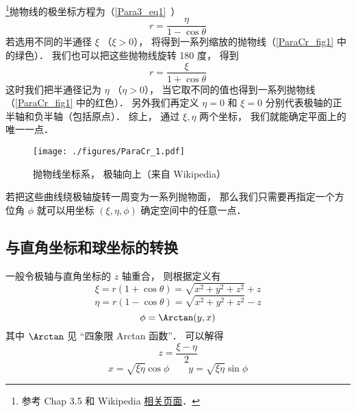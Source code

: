 

\footnote{参考 \cite{Brandsen} Chap 3.5 和 Wikipedia \href{https://en.wikipedia.org/wiki/Parabolic_coordinates}{相关页面}．}抛物线的极坐标方程为（\autoref{Para3_eq1}~）
\begin{equation}\label{ParaCr_eq1}
r = \frac{\eta}{1 - \cos \theta }
\end{equation}
若选用不同的半通径 $\xi$ （$\xi > 0$）， 将得到一系列缩放的抛物线（\autoref{ParaCr_fig1} 中的绿色）． 我们也可以把这些抛物线旋转 180 度， 得到
\begin{equation}
r = \frac{\xi}{1 + \cos \theta }
\end{equation}
这时我们把半通径记为 $\eta$ （$\eta > 0$）， 当它取不同的值也得到一系列抛物线（\autoref{ParaCr_fig1} 中的红色）． 另外我们再定义 $\eta = 0$ 和 $\xi = 0$ 分别代表极轴的正半轴和负半轴（包括原点）． 综上， 通过 $\xi, \eta$ 两个坐标， 我们就能确定平面上的唯一一点．

\begin{figure}[ht]
\centering
\texttt{[image: ./figures/ParaCr\_1.pdf]}
\caption{抛物线坐标系， 极轴向上（来自 Wikipedia）} \label{ParaCr_fig1}
\end{figure}

若把这些曲线绕极轴旋转一周变为一系列抛物面， 那么我们只需要再指定一个方位角 $\phi$ 就可以用坐标 $(\xi, \eta, \phi)$ 确定空间中的任意一点．

\subsection{与直角坐标和球坐标的转换}
一般令极轴与直角坐标的 $z$ 轴重合， 则根据定义有
\begin{equation}
\xi = r(1 + \cos\theta) = \sqrt{x^2 + y^2 + z^2} + z
\end{equation}
\begin{equation}
\eta = r(1 - \cos\theta) = \sqrt{x^2 + y^2 + z^2} - z
\end{equation}
\begin{equation}
\phi = \Arctan(y, x)
\end{equation}
其中 $\Arctan$ 见 “四象限 Arctan 函数”． 可以解得
\begin{equation}\label{ParaCr_eq2}
z = \frac{\xi - \eta}{2}
\end{equation}
\begin{equation}\label{ParaCr_eq3}
x = \sqrt{\xi\eta}\cos\phi \qquad
y = \sqrt{\xi\eta}\sin\phi
\end{equation}

